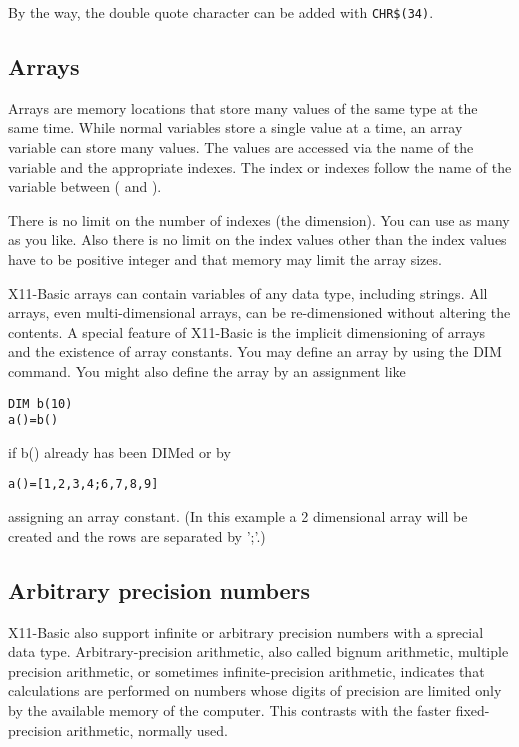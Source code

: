 By the way, the double quote character can be added with \verb|CHR$(34)|.

\subsection{Arrays}

Arrays are memory locations that store many values of the same type at the same
time. While normal variables store a single value at a time, an array variable
can store many values. The values are accessed via the name of the variable and
the appropriate indexes. The index or indexes follow the name of the variable
between ( and ). 

There is no limit on the number of indexes (the dimension). You can use as 
many as you like.
Also there is no limit on the index values other than the index values have to
be positive integer and that memory may limit the array sizes.

X11-Basic arrays can contain variables of any data type, including strings. All
arrays, even multi-dimensional arrays, can be re-dimensioned without altering
the contents. A special feature of X11-Basic is the implicit dimensioning of
arrays and the existence of array constants. You may define an array by using
the DIM command. You might also define the array by an assignment like
\begin{mdframed}[hidealllines=true,backgroundcolor=blue!20]
\begin{verbatim}
DIM b(10)
a()=b() 
\end{verbatim}
\end{mdframed}
if b() already has been DIMed or by 
\begin{mdframed}[hidealllines=true,backgroundcolor=blue!20]
\begin{verbatim}
a()=[1,2,3,4;6,7,8,9]
\end{verbatim}
\end{mdframed}
assigning an array constant. (In this example a 2 dimensional array will be
created and the rows are separated by ';'.)

\subsection{Arbitrary precision numbers}

X11-Basic also support infinite or arbitrary precision numbers with a sprecial
data type. Arbitrary-precision arithmetic, also called bignum arithmetic, 
multiple precision arithmetic, or sometimes infinite-precision arithmetic, 
indicates that calculations are performed on numbers whose digits of precision 
are limited only by the available memory of the computer. 
This contrasts with the faster fixed-precision arithmetic, normally used.

